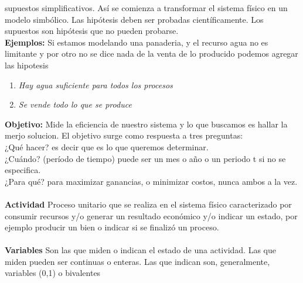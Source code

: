 \documentclass[12pt]{book}
\begin{document}
supuestos simplificativos. Así se comienza a transformar el sistema físico en un modelo simbólico.
Las hipótesis deben ser probadas científicamente. Los supuestos son hipótesis que no pueden probarse.
\\
\textbf{Ejemplos:}
Si estamos modelando una panaderia, y el recurso agua no es limitante y por otro no se dice nada de 				la venta de lo producido podemos agregar las hipotesis
\begin{enumerate}
	\item 	
	\textit{Hay agua suficiente para todos los procesos}
	\item
	\textit{Se vende todo lo que se produce}
\end{enumerate}
\textbf{Objetivo: }Mide la eficiencia de nuestro sistema y lo que buscamos es hallar la merjo solucion. El objetivo surge como respuesta a tres preguntas:
\\¿Qué hacer? es decir que es lo que queremos determinar.
\\¿Cuándo? (período de tiempo) puede ser un mes o año o un periodo t si no se especifica.
\\¿Para qué? para maximizar ganancias, o minimizar costos, nunca ambos a la vez.
\\
\\
\textbf{Actividad}
Proceso unitario que se realiza en el sistema físico caracterizado por consumir recursos
y/o generar un resultado económico y/o indicar un estado, por ejemplo producir un bien o indicar si se finaliz\'o un proceso.
\\
\\
\textbf{Variables}
Son las que miden o indican el estado de una actividad.
Las que miden pueden ser continuas o enteras.
Las que indican son, generalmente, variables (0,1) o bivalentes
\end{document}
